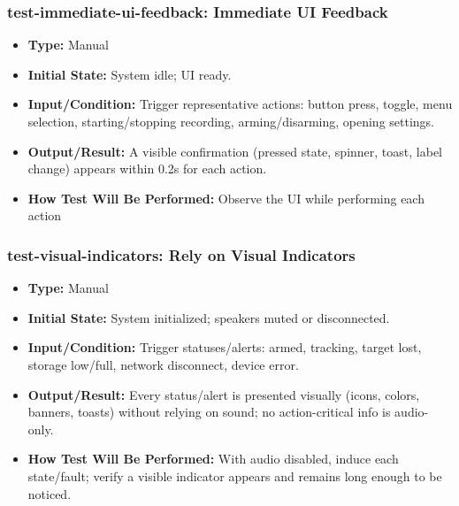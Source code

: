 \documentclass[12pt, titlepage]{article}
\begin{document}
\subsubsection*{test-immediate-ui-feedback: Immediate UI Feedback}
\begin{itemize}
  \item \textbf{Type:} Manual
  \item \textbf{Initial State:} System idle; UI ready.
  \item \textbf{Input/Condition:} Trigger representative actions: button press, toggle, menu selection, starting/stopping recording, arming/disarming, opening settings.
  \item \textbf{Output/Result:} A visible confirmation (pressed state, spinner, toast, label change) appears within 0.2s for each action.
  \item \textbf{How Test Will Be Performed:} Observe the UI while performing each action
\end{itemize}

\subsubsection*{test-visual-indicators: Rely on Visual Indicators}
\begin{itemize}
  \item \textbf{Type:} Manual
  \item \textbf{Initial State:} System initialized; speakers muted or disconnected.
  \item \textbf{Input/Condition:} Trigger statuses/alerts: armed, tracking, target lost, storage low/full, network disconnect, device error.
  \item \textbf{Output/Result:} Every status/alert is presented visually (icons, colors, banners, toasts) without relying on sound; no action-critical info is audio-only.
  \item \textbf{How Test Will Be Performed:} With audio disabled, induce each state/fault; verify a visible indicator appears and remains long enough to be noticed.
\end{itemize}
\end{document}
